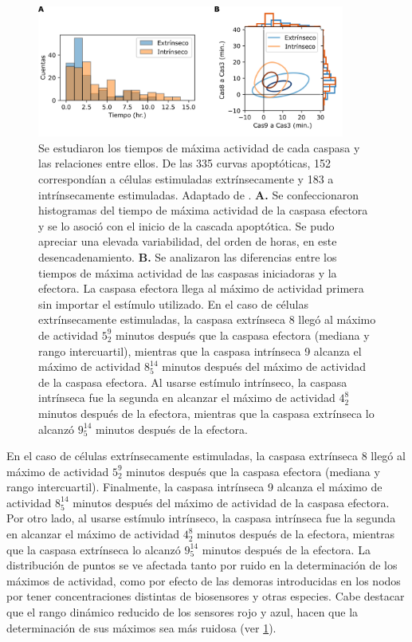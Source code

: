 \begin{figure}[htb]
    \centering
    \includegraphics[width=0.9\textwidth]{img/cap_4/tiempos_experimentales.png}
    \caption{\footnotesize{Se estudiaron los tiempos de máxima actividad de cada caspasa y las relaciones entre ellos. De las 335 curvas apoptóticas, 152 correspondían a células estimuladas extrínsecamente y 183 a intrínsecamente estimuladas. Adaptado de \cite{Corbat2021}. \textbf{A.} Se confeccionaron histogramas del tiempo de máxima actividad de la caspasa efectora y se lo asoció con el inicio de la cascada apoptótica. Se pudo apreciar una elevada variabilidad, del orden de horas, en este desencadenamiento. \textbf{B.} Se analizaron las diferencias entre los tiempos de máxima actividad de las caspasas iniciadoras y la efectora. La caspasa efectora llega al máximo de actividad primera sin importar el estímulo utilizado. En el caso de células extrínsecamente estimuladas, la caspasa extrínseca 8 llegó al máximo de actividad $5_2^9$ minutos después que la caspasa efectora (mediana y rango intercuartil), mientras que la caspasa intrínseca 9 alcanza el máximo de actividad $8_5^{14}$ minutos después del máximo de actividad de la caspasa efectora. Al usarse estímulo intrínseco, la caspasa intrínseca fue la segunda en alcanzar el máximo de actividad $4_2^8$ minutos después de la efectora, mientras que la caspasa extrínseca lo alcanzó $9_5^{14}$ minutos después de la efectora.}}
    \label{fig:tiempos_experimentales}
\end{figure}

En el caso de células extrínsecamente estimuladas, la caspasa extrínseca 8 llegó al máximo de actividad $5_2^9$ minutos después que la caspasa efectora (mediana y rango intercuartil). Finalmente, la caspasa intrínseca 9 alcanza el máximo de actividad $8_5^{14}$ minutos después del máximo de actividad de la caspasa efectora. Por otro lado, al usarse estímulo intrínseco, la caspasa intrínseca fue la segunda en alcanzar el máximo de actividad $4_2^8$ minutos después de la efectora, mientras que la caspasa extrínseca lo alcanzó $9_5^{14}$ minutos después de la efectora. La distribución de puntos se ve afectada tanto por ruido en la determinación de los máximos de actividad, como por efecto de las demoras introducidas en los nodos por tener concentraciones distintas de biosensores y otras especies. Cabe destacar que el rango dinámico reducido de los sensores rojo y azul, hacen que la determinación de sus máximos sea más ruidosa (ver \cref{fig:tiempos_experimentales}).


